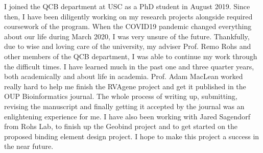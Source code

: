 I joined the QCB department at USC as a PhD student in August 2019. Since then, I have been diligently
working on my research projects alongside required coursework of the program. When the COVID19
pandemic changed everything about our life during March 2020, I was very unsure of the future.
Thankfully, due to wise and loving care of the university, my adviser Prof. Remo Rohs and other members of the QCB
department, I was able to continue my work through the difficult times. I have learned much in the
past one and three quarter years, both academically and about life in academia. Prof. Adam MacLean
worked really hard to help me finish the RVAgene project and get it published in the  OUP
Bioinformatics journal. The whole process of writing up, submitting, revising the manuscript and
finally getting it accepted by the journal was an enlightening experience for me. I have also been
working with Jared Sagendorf from Rohs Lab, to finish up the Geobind project and to
get started on the proposed binding element design project.  I hope to make this project a success
in the near future. 

